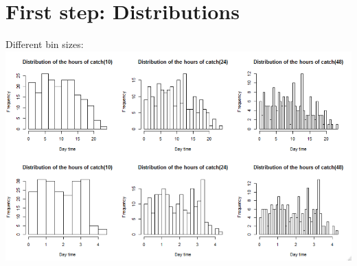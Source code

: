 \documentclass[12pt]{article} %
\begin{document}
\section{First step: Distributions}
Different bin sizes:\\
\includegraphics[scale=.55]{general_distributions}\\
\end{document}
